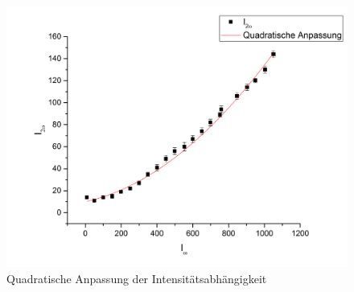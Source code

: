 \begin{figure}[H]
	\begin{center}
		\includegraphics[scale=.5]{Bilder/IntPol2.png}
		\caption{Quadratische Anpassung der Intensitätsabhängigkeit}
		\label{pol2}
	\end{center}
\end{figure}

